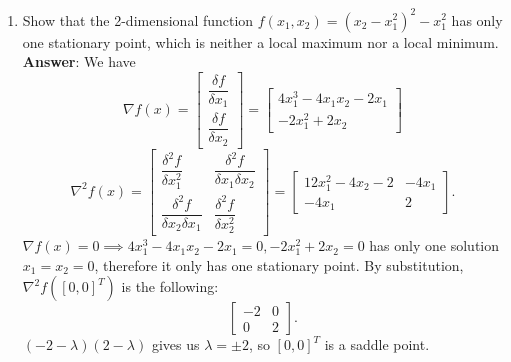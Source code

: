 \documentclass{article}
\begin{document}
\begin{enumerate}
\begin{enumerate}
\begin{center}
\begin{tabular}{|c|c|c|c|c|}
                        \end{tabular}
                    \end{center}
              \item Show that the 2-dimensional function $f(x_1,x_2)=(x_2-x_1^2)^2-x_1^2$ has only one stationary point, which is neither a local maximum nor a local minimum.\\
                    \textbf{Answer}: We have \[
                        \nabla f(x)=\begin{bmatrix}
                            \dfrac{\delta f}{\delta x_1} \\\dfrac{\delta f}{\delta x_2}
                        \end{bmatrix}=\begin{bmatrix}
                            4x_1^3-4x_1x_2-2x_1 \\-2x_1^2+2x_2
                        \end{bmatrix}
                    \]\[
                        \nabla^2 f(x)=\begin{bmatrix}
                            \dfrac{\delta^2 f}{\delta x_1^2} & \dfrac{\delta^2 f}{\delta x_1\delta x_2} \\\dfrac{\delta^2 f}{\delta x_2\delta x_1}&\dfrac{\delta^2 f}{\delta x_2^2}
                        \end{bmatrix}=\begin{bmatrix}
                            12x_1^2-4x_2-2 & -4x_1 \\
                            -4x_1          & 2
                        \end{bmatrix}.
                    \] $\nabla f(x)=0\implies 4x_1^3-4x_1x_2-2x_1=0, -2x_1^2+2x_2=0$ has only one solution $x_1=x_2=0$, therefore it only has one stationary point. By substitution, $\nabla^2 f([0,0]^T)$ is the following: \[\begin{bmatrix}
                            -2 & 0 \\0&2
                        \end{bmatrix}.
                    \] $(-2-\lambda)(2-\lambda)$ gives us $\lambda=\pm 2$, so $[0,0]^T$ is a saddle point.
          \end{enumerate}
\end{enumerate}
\end{document}
